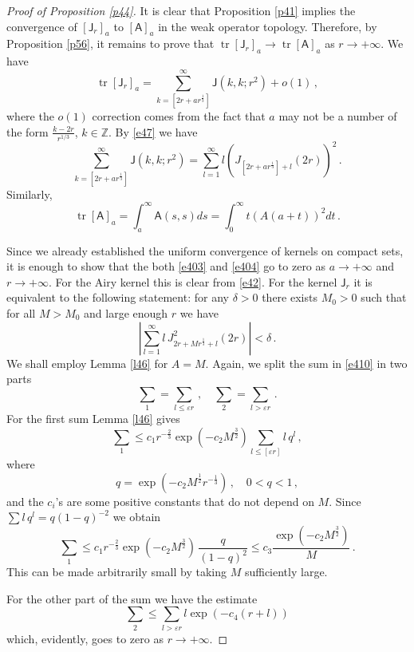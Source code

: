 \documentclass[12pt]{amsart}
\newcommand{\tr}{\operatorname{tr}}
\newcommand{\A}{\mathsf{A}}
\newcommand{\J}{\mathsf{J}}
\newcommand{\Z}{\mathbb{Z}}
\theoremstyle{plain}
\theoremstyle{definition}
\numberwithin{equation}{section}
\begin{document}
\begin{proof}[Proof of Proposition \ref{p44}]
It is clear that Proposition \ref{p41}  implies the convergence 
of $[\J_r]_a$ to $[\A]_a$ in 
the weak operator topology. Therefore, by Proposition \ref{p56}, it remains to prove that 
$\tr[\J_r]_a\to\tr[\A]_a$ as $r\to+\infty$. We have
%
\begin{equation*}
\tr[\J_r]_a=\sum_{k=[2r+ar^{\frac13}]}^\infty\J(k,k;{r^2})+o(1)\,,
\end{equation*}
%
where the $o(1)$ correction comes from the fact that $a$ may not be a number
of the form $\frac{k-2r}{r^{1/3}}$,  $k\in\Z$.  By \eqref{e47} we have 
%
\begin{equation}\label{e403}
\sum_{k=[2r+ar^{\frac13}]}^\infty\J(k,k;{r^2})
=\sum_{l=1}^\infty l\left(J_{[2r+ar^{\frac13}]+l}(2r)\right)^2 \,.
\end{equation}
%
Similarly, 
%
\begin{equation}\label{e404}
\tr[\A]_a=\int_a^{\infty}\A(s,s)ds=\int_0^\infty t(A(a+t))^2dt\,.
\end{equation}
%

Since we already established  the uniform convergence of kernels on compact sets, it is 
enough to show that the both \eqref{e403} and \eqref{e404} go to zero as $a\to+\infty$ and 
$r\to+\infty$. For the Airy kernel this is clear from \eqref{e42}. For the kernel $\J_r$
it is equivalent to the following statement: for any $\delta>0$ there 
exists $M_0>0$ such that for all $M>M_0$ and large enough $r$
we have 
%
\begin{equation}\label{e410}
\left|\sum_{l=1}^\infty l \, J_{2r+Mr^{\frac 13}+l}^2(2r)\right|<\delta \,. 
\end{equation}
%
We shall employ Lemma \ref{l46} for $A=M$. Again, we split the sum 
 in \eqref{e410} in two parts
%
\begin{equation*}
{\sum}_1=\sum_{l\le \varepsilon r}\,, \quad  
{\sum}_2=\sum_{l> \varepsilon r}\,.
\end{equation*}
%
For the first sum Lemma \ref{l46} gives
%
\begin{equation*}
{\sum}_1\le 
c_1r^{-\frac 23}\exp\left(-c_2M^{\frac 32}\right)\sum_{l\le [\varepsilon 
r]}l\, q^l\,,
\end{equation*}
%
where
%
\begin{equation*}
q=\exp\left(-c_2M^{\frac 12}r^{-\frac 13}\right)\,, \quad 0<q<1\,, 
\end{equation*}
%
and the $c_i$'s are some  positive constants that do not depend on $M$. 
Since $\sum l\, q^l = q (1-q)^{-2}$ we obtain
%
\begin{equation*}
{\sum}_1 \le 
c_1r^{-\frac 23}\exp\left(-c_2M^{\frac 32}\right) \, \frac{q}{(1-q)^2} \le
c_3\frac{\exp\left(-c_2M^{\frac 32}\right)}{M} \,. 
\end{equation*}
%
This can be made arbitrarily small by taking $M$ sufficiently large.

For the other part of the sum we have the estimate
%
\begin{equation*}
{\sum}_2 \le
\sum_{l> \varepsilon r}l \exp(-c_4(r+l))
\end{equation*}
%
which, evidently, goes to zero as $r\to+\infty$.
\end{proof}
\end{document}
